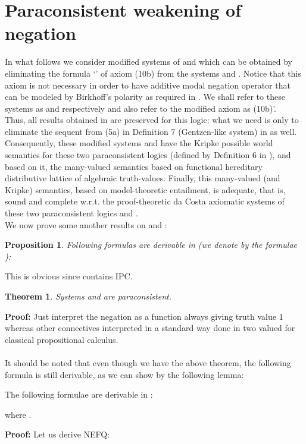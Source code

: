 \documentclass{llncs}
\newtheorem{theo}{Theorem}
\newtheorem{propo}{Proposition}
\begin{document}
\section{Paraconsistent weakening of negation}
In what follows we
consider modified systems of  and  which can be obtained
by eliminating the formula `' of axiom (10b)
from the systems  and . Notice that this axiom is not
necessary in order to have additive modal negation operator that can
be modeled by Birkhoff's polarity as required in \cite{Majk08dc}. We
shall refer to these systems as  and  respectively and
also refer to the modified
axiom as (10b)'.\\
Thus, all results obtained in \cite{Majk08dc} are preserved for this
logic: what we need is only to eliminate the sequent  from (5a) in Definition 7 (Gentzen-like system) in
\cite{Majk08dc} as well.\\
Consequently, these modified systems  and  have the
Kripke possible world semantics
 for these two paraconsistent logics (defined by Definition 6 in \cite{Majk08dc}), and based on it, the
 many-valued semantics based on functional hereditary distributive
 lattice of algebraic truth-values. Finally,  this many-valued (and Kripke) semantics, based on model-theoretic entailment, is
 adequate, that is, sound and complete w.r.t. the proof-theoretic da
 Costa axiomatic systems of these two paraconsistent logics  and
 .\\
 We now prove some another results on  and :
\begin{propo}
Following formulas are derivable in  (we denote by  the formulae ):

\end{propo}
This is obvious since  contains IPC.
\begin{theo}
Systems  and  are paraconsistent.
\end{theo}
\textbf{Proof:}  Just interpret the negation as a function always
giving truth value 1 whereas other connectives interpreted in a
standard way done in two valued for classical propositional
calculus.\\\\
It should be noted that even though we have the above theorem, the
following formula   is still
derivable, as we can show by the following lemma:
\begin{lemma}
The following formulae are derivable in :



where .
\end{lemma}
\textbf{Proof:} Let us derive NEFQ:
\end{document}
